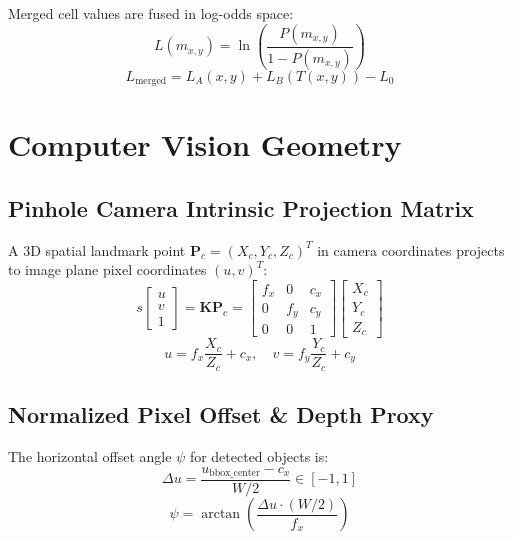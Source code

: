 \documentclass[10pt,a4paper]{article}
\begin{document}
Merged cell values are fused in log-odds space:
\begin{equation}
L(m_{x,y}) = \ln\left(\frac{P(m_{x,y})}{1 - P(m_{x,y})}\right)
\end{equation}
\begin{equation}
L_{\text{merged}} = L_A(x,y) + L_B(T(x,y)) - L_0
\end{equation}

\section{Computer Vision Geometry}

\subsection{Pinhole Camera Intrinsic Projection Matrix}
A 3D spatial landmark point $\mathbf{P}_c = (X_c, Y_c, Z_c)^T$ in camera coordinates projects to image plane pixel coordinates $(u, v)^T$:
\begin{equation}
s \begin{bmatrix} u \\ v \\ 1 \end{bmatrix} = \mathbf{K} \mathbf{P}_c = \begin{bmatrix} f_x & 0 & c_x \\ 0 & f_y & c_y \\ 0 & 0 & 1 \end{bmatrix} \begin{bmatrix} X_c \\ Y_c \\ Z_c \end{bmatrix}
\end{equation}
\begin{equation}
u = f_x \frac{X_c}{Z_c} + c_x, \quad v = f_y \frac{Y_c}{Z_c} + c_y
\end{equation}

\subsection{Normalized Pixel Offset \& Depth Proxy}
The horizontal offset angle $\psi$ for detected objects is:
\begin{equation}
\Delta u = \frac{u_{\text{bbox\_center}} - c_x}{W / 2} \in [-1, 1]
\end{equation}
\begin{equation}
\psi = \arctan\left(\frac{\Delta u \cdot (W/2)}{f_x}\right)
\end{equation}
\end{document}
